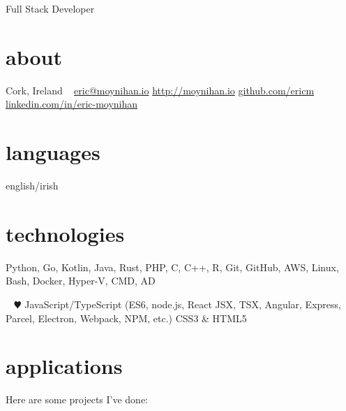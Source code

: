 \documentclass[]{friggeri-cv}
\begin{document}
       {Full Stack Developer}


\begin{aside}
  \section{about}
    Cork,
    Ireland
    ~
    \href{mailto:eric@moynihan.io}{eric@moynihan.io}
    \href{http://moynihan.io}{http://moynihan.io}
    \href{http://github.com/ericm}{github.com/ericm}
    \href{https://www.linkedin.com/in/eric-moynihan}{linkedin.com/in/eric-moynihan}
  \section{languages}
    english/irish
  \section{technologies}
    Python, Go, Kotlin,
    Java, Rust, PHP,
    C, C++, R,
    Git, GitHub, AWS,
    Linux, Bash, Docker,
    Hyper-V, CMD, AD
    
    ~
    {\color{red} $\varheartsuit$} JavaScript/TypeScript
    (ES6, node.js, React JSX, TSX, Angular, Express, Parcel, Electron, Webpack, NPM, etc.)
    CSS3 \& HTML5
    
\end{aside}

\section{applications}

Here are some projects I've done:
\end{document}
